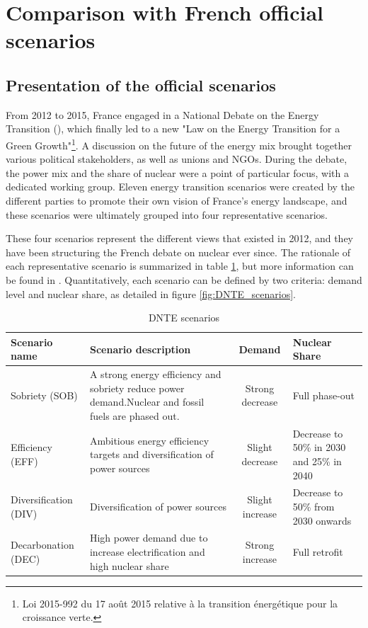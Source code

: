 
\section{Comparison with French official scenarios}
\label{sec:comparison}

\subsection{Presentation of the official scenarios}

From 2012 to 2015, France engaged in a National Debate on the Energy Transition (\dnte), which finally led to a new "Law on the Energy Transition for a Green Growth"\footnote{
	Loi 2015-992 du 17 août 2015 relative à la transition énergétique pour la croissance verte.
}.
A discussion on the future of the energy mix brought together various political stakeholders, as well as unions and NGOs.
During the debate, the power mix and the share of nuclear were a point of particular focus, with a dedicated working group. Eleven energy transition scenarios were created by the different parties to promote their own vision of France's energy landscape, and these scenarios were ultimately grouped into four representative scenarios.

These four scenarios represent the different views that existed in 2012, and they have been structuring the French debate on nuclear ever since. The rationale of each representative scenario is summarized in table \ref{tab:dnteScenarios}, but more information can be found in \citet{DNTE_gt2}.
Quantitatively, each scenario can be defined by two criteria: demand level and nuclear share, as detailed in figure \ref{fig:DNTE_scenarios}.

\begin{table}
	\begin{tabular}{p{2cm}p{6cm}cp{2.5cm}}
		\toprule
		Scenario name & Scenario description & Demand & Nuclear Share \\
		\midrule
		Sobriety (SOB)     	& A strong energy efficiency and sobriety reduce power demand.\newline Nuclear and fossil fuels are phased out. & Strong decrease & Full phase-out \\
		Efficiency (EFF)  	 & Ambitious energy efficiency targets and diversification of power sources & Slight decrease & Decrease to 50\% in 2030 and 25\% in 2040 \\
		Diversification (DIV) 	& Diversification of power sources & Slight increase & Decrease to 50\% from 2030 onwards \\
		Decarbonation (DEC)  & High power demand due to increase electrification and high nuclear share & Strong increase & Full retrofit \\
		\bottomrule
	\end{tabular}
	\caption{\label{tab:dnteScenarios}DNTE scenarios}
\end{table}


